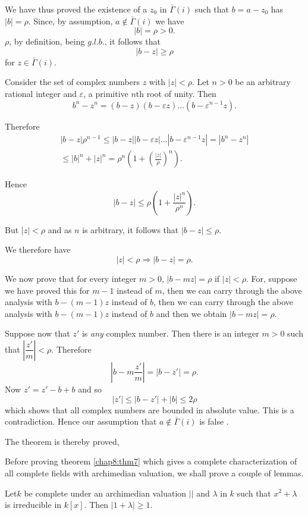 We have thus proved the existence of a $z_0$ in $\bar{\Gamma} (i)$
such that $b = a - z_0$ has $|b| = \rho $. Since, by assumption, $a
\notin \bar{\Gamma}(i)$ we have  
$$
|b| = \rho > 0.
$$
$\rho$, by definition, being $g.l.b.$, it follows that  
$$
| b - z| \geq \rho 
$$
for $z \in \bar{\Gamma}(i)$.

Consider the set of complex numbers $z$  with $|z| < \rho$.  
Let $n > 0$ be an arbitrary rational integer and $\varepsilon$, a
primitive $n$th root of unity. Then  
$$
b^n - z^n = ( b - z) (b - \varepsilon z) \ldots (b - \varepsilon ^{ n
  -1}z).  
$$

Therefore\pageoriginale 
\begin{gather*}
|b - z | \rho^{ n - 1} \leq | b - z| | b - \varepsilon z|  \ldots | b
-\varepsilon^{ n - 1}  z |= | b^n - z^n | \\ 
\leq |b|^n + |z|^n = \rho^n ( 1+ (\frac{|z|}{\rho})^n ). 
\end{gather*}

Hence
$$
|b - z |\leq \rho \left( 1+ \frac{|z|^n}{\rho^n} \right). 
$$

But $|z| < \rho$ and as $n$ is arbitrary, it follows that $ |b - z |
\leq \rho$. 

We therefore have 
$$
|z| < \rho \Rightarrow |b - z| = \rho.  
$$

We now prove that for every integer $m > 0$, $|b - mz| = \rho $  if $|z|
< \rho$. For, suppose we have proved this for $m - 1$ instead of $m$,
then we can carry through the above analysis with $b- (m - 1)z$ instead
of $b$, then we can carry through the above analysis with $ b -
(m-1)z$ instead of $b$ and then we obtain $|b - mz| = \rho$. 

Suppose now that $z'$ is \textit{any} complex number. Then there is
an integer $m > 0$ such that $|\dfrac{z'}{m}|< \rho$.  Therefore 
$$
\left|b-m \frac{z'}{m} \right|=|b-z'|=\rho.
$$
Now $z ' = z' - b + b$ and so 
$$
|z'| \leq |b - z'| + |b| \leq 2 \rho  
$$
which shows that all complex numbers are bounded in absolute
value. This is a contradiction. Hence our assumption that $a \notin
\bar{\Gamma} (i)$  is false .  

The theorem is thereby proved,  

Before proving theorem \ref{chap8:thm7} which gives a complete
characterization of 
all complete fields with archimedian valuation, we shall prove a
couple of lemmas.  

\begin{lem}\label{chap8:lem4} %
 Let\pageoriginale $k$ be complete under an archimedian valuation $||$ and
  $\lambda$ in $k$  such that $x^2 + \lambda$ is irreducible in
  $k[x]$. Then $| 1 + \lambda | \geq 1$.  
\end{lem}

